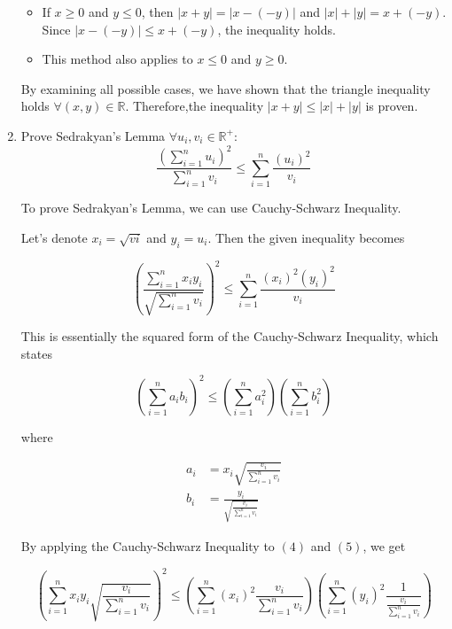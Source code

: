 \documentclass{article}
\begin{document}
\begin{enumerate}
	      \begin{itemize}
		      \item If $x \geq 0$ and $y \leq 0$, then $|x + y| = |x - (-y)|$ and $|x| + |y| = x + (-y)$. Since $|x - (-y)| \leq x + (-y)$, the inequality holds.
		      \item This method also applies to $x \leq 0$ and $y \geq 0$.
	      \end{itemize}

	      By examining all possible cases, we have shown that the triangle inequality holds $\forall(x, y) \in \mathbb{R}$. Therefore,the inequality $|x + y| \leq |x| + |y|$ is proven.

	\item Prove Sedrakyan's Lemma $\forall u_i, v_i \in \mathbb{R}^+$:
	      \setcounter{equation}{0}
	      \begin{equation}
		      \frac{(\sum_{i = 1}^n u_i)^2}{\sum_{i = 1}^n v_i} \leq \sum_{i=1}^n \frac{(u_i)^2}{v_i}
	      \end{equation}

	      To prove Sedrakyan's Lemma, we can use Cauchy-Schwarz Inequality.

	      Let's denote $x_i = \sqrt{vi}$ and $y_i = u_i$. Then the given inequality becomes

	      \begin{equation}
		      \left(\frac{\sum_{i=1}^{n}x_iy_i}{\sqrt{\sum_{i=1}^{n}v_i}}\right)^2 \leq \sum_{i=1}^{n}\frac{(x_i)^2 (y_i)^2}{v_i}
	      \end{equation}

	      This is essentially the squared form of the Cauchy-Schwarz Inequality, which states

	      \begin{equation}
		      \left(\sum_{i=1}^{n}a_i b_i\right)^2 \leq \left(\sum_{i=1}^{n}a_i^2\right) \left(\sum_{i=1}^{n}b_i^2\right)
	      \end{equation}

	      where

	      \begin{align}
		      a_i & = x_i\sqrt{\frac{v_i}{\sum_{i=1}^{n}v_i}}          \\
		      b_i & = \frac{y_i}{\sqrt{\frac{v_i}{\sum_{i=1}^{n}v_i}}}
	      \end{align}

	      By applying the Cauchy-Schwarz Inequality to $(4)$ and $(5)$, we get

	      \begin{equation}
		      \left(\sum_{i=1}^{n}x_i y_i \sqrt{\frac{v_i}{\sum_{i=1}^{n}v_i}}\right)^2 \leq \left(\sum_{i=1}^{n}(x_i)^2 \frac{v_i}{\sum_{i=1}^{n}v_i}\right) \left(\sum_{i=1}^{n}(y_i)^2 \frac{1}{\frac{v_i}{\sum_{i=1}^{n}v_i}}\right)
	      \end{equation}


\end{enumerate}
\end{document}
